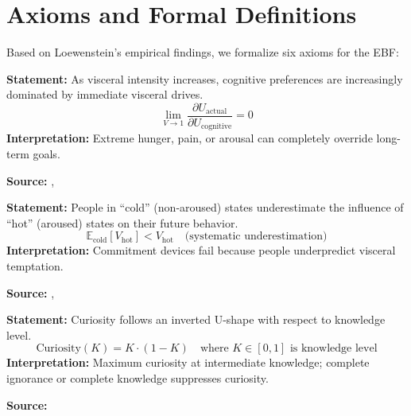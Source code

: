 \section{Axioms and Formal Definitions}
\label{sec:lo-axioms}

Based on Loewenstein's empirical findings, we formalize six axioms for the EBF:

\begin{tcolorbox}[colback=gray!5!white, colframe=gray!75!black,
    title=Axiom UNMAPPED_LO-1: Visceral Override]
\textbf{Statement:} As visceral intensity increases, cognitive preferences are increasingly dominated by immediate visceral drives.
\begin{equation}
\lim_{V \to 1} \frac{\partial U_{\text{actual}}}{\partial U_{\text{cognitive}}} = 0
\end{equation}
\textbf{Interpretation:} Extreme hunger, pain, or arousal can completely override long-term goals.

\textbf{Source:} \citet{loewenstein1996out}, \citet{loewenstein2005visceral}
\end{tcolorbox}

\begin{tcolorbox}[colback=gray!5!white, colframe=gray!75!black,
    title=Axiom UNMAPPED_LO-2: Hot-Cold Empathy Gap]
\textbf{Statement:} People in ``cold'' (non-aroused) states underestimate the influence of ``hot'' (aroused) states on their future behavior.
\begin{equation}
\mathbb{E}_{\text{cold}}[V_{\text{hot}}] < V_{\text{hot}} \quad \text{(systematic underestimation)}
\end{equation}
\textbf{Interpretation:} Commitment devices fail because people underpredict visceral temptation.

\textbf{Source:} \citet{loewenstein2006hot}, \citet{loewenstein2000projecting}
\end{tcolorbox}

\begin{tcolorbox}[colback=gray!5!white, colframe=gray!75!black,
    title=Axiom UNMAPPED_LO-3: Curiosity as Information Gap]
\textbf{Statement:} Curiosity follows an inverted U-shape with respect to knowledge level.
\begin{equation}
\text{Curiosity}(K) = K \cdot (1-K) \quad \text{where } K \in [0,1] \text{ is knowledge level}
\end{equation}
\textbf{Interpretation:} Maximum curiosity at intermediate knowledge; complete ignorance or complete knowledge suppresses curiosity.

\textbf{Source:} \citet{loewenstein1999becausecuriosity}
\end{tcolorbox}

